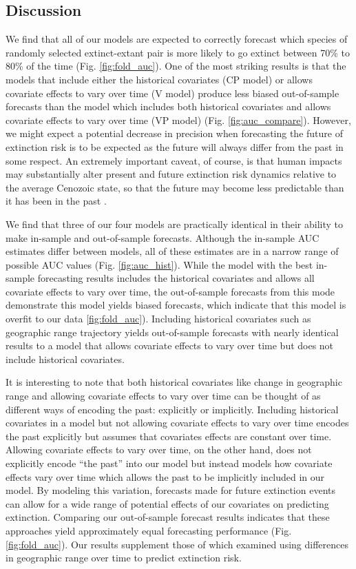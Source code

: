 \documentclass[12pt,letterpaper]{article}
\begin{document}
\begin{refsection}
\section{Discussion}

We find that all of our models are expected to correctly forecast which species of randomly selected extinct-extant pair is more likely to go extinct between 70\% to 80\% of the time (Fig. \ref{fig:fold_auc}). 
One of the most striking results is that the models that include either the historical covariates (CP model) or allows covariate effects to vary over time (V model) produce less biased out-of-sample forecasts than the model which includes both historical covariates and allows covariate effects to vary over time (VP model) (Fig. \ref{fig:auc_compare}). However, we might expect a potential decrease in precision when forecasting the future of extinction risk is to be expected as the future will always differ from the past in some respect. An extremely important caveat, of course, is that human impacts may substantially alter present and future extinction risk dynamics relative to the average Cenozoic state, so that the future may become less predictable than it has been in the past \citep{Harnik2012a,Finnegan2015}.

We find that three of our four models are practically identical in their ability to make in-sample and out-of-sample forecasts. Although the in-sample AUC estimates differ between models, all of these estimates are in a narrow range of possible AUC values (Fig. \ref{fig:auc_hist}). While the model with the best in-sample forecasting results includes the historical covariates and allows all covariate effects to vary over time, the out-of-sample forecasts from this mode demonstrate this model yields biased forecasts, which indicate that this model is overfit to our data \ref{fig:fold_auc}). Including historical covariates such as geographic range trajectory yields out-of-sample forecasts with nearly identical results to a model that allows covariate effects to vary over time but does not include historical covariates. 

It is interesting to note that both historical covariates like change in geographic range and allowing covariate effects to vary over time can be thought of as different ways of encoding the past: explicitly or implicitly. Including historical covariates in a model but not allowing covariate effects to vary over time encodes the past explicitly but assumes that covariates effects are constant over time. Allowing covariate effects to vary over time, on the other hand, does not explicitly encode ``the past'' into our model but instead models how covariate effects vary over time which allows the past to be implicitly included in our model. By modeling this variation, forecasts made for future extinction events can allow for a wide range of potential effects of our covariates on predicting extinction. Comparing our out-of-sample forecast results indicates that these approaches yield approximately equal forecasting performance (Fig. \ref{fig:fold_auc}). Our results supplement those of \citet{Kiessling2016} which examined using differences in geographic range over time to predict extinction risk. 


\end{refsection}
\end{document}

